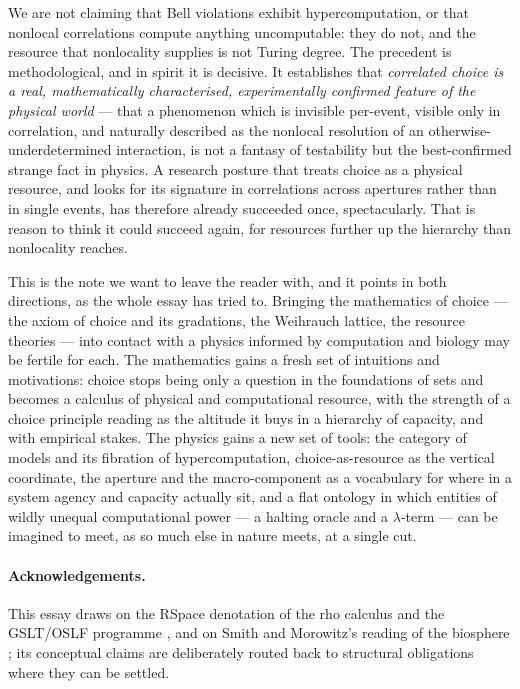 We are not claiming that Bell violations exhibit hypercomputation, or that nonlocal correlations
compute anything uncomputable: they do not, and the resource that nonlocality supplies is not
Turing degree. The precedent is methodological, and in spirit it is decisive. It establishes
that \emph{correlated choice is a real, mathematically characterised, experimentally confirmed
feature of the physical world} --- that a phenomenon which is invisible per-event, visible only
in correlation, and naturally described as the nonlocal resolution of an otherwise-underdetermined
interaction, is not a fantasy of testability but the best-confirmed strange fact in physics.
A research posture that treats choice as a physical resource, and looks for its signature in
correlations across apertures rather than in single events, has therefore already succeeded once,
spectacularly. That is reason to think it could succeed again, for resources further up the
hierarchy than nonlocality reaches.

This is the note we want to leave the reader with, and it points in both directions, as the whole
essay has tried to. Bringing the mathematics of choice --- the axiom of choice and its gradations,
the Weihrauch lattice, the resource theories --- into contact with a physics informed by computation
and biology may be fertile for each. The mathematics gains a fresh set of intuitions and motivations:
choice stops being only a question in the foundations of sets and becomes a calculus of physical and
computational resource, with the strength of a choice principle reading as the altitude it buys in a
hierarchy of capacity, and with empirical stakes. The physics gains a new set of tools: the category
of models and its fibration of hypercomputation, choice-as-resource as the vertical coordinate, the
aperture and the macro-component as a vocabulary for where in a system agency and capacity actually
sit, and a flat ontology in which entities of wildly unequal computational power --- a halting oracle
and a $\lambda$-term --- can be imagined to meet, as so much else in nature meets, at a single cut.

\paragraph{Acknowledgements.}
This essay draws on the RSpace denotation of the rho calculus \cite{qcs,paths} and the GSLT/OSLF
programme \cite{OSLF}, and on Smith and Morowitz's reading of the biosphere \cite{SmithMorowitz}; its
conceptual claims are deliberately routed back to structural obligations where they can be settled.
